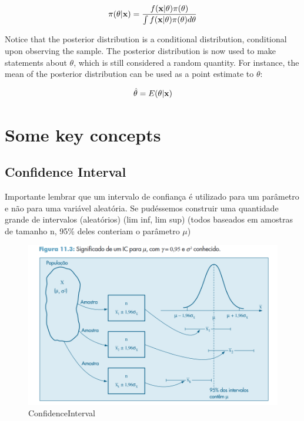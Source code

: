 \begin{itemize}
    \begin{equation}
        \pi(\theta|\bold{x}) = \frac{f(\bold{x}|\theta)\pi(\theta)}{\int f(\bold{x}|\theta)\pi(\theta) d\theta}
    \end{equation}
    
    Notice that the posterior distribution is a conditional distribution, conditional upon observing the sample. The posterior distribution is now used to make statements about $\theta$, which is still considered a random quantity. For instance, the mean of the posterior distribution can be used as a point estimate to $\theta$:
    
    \begin{equation}
        \hat{\theta} = E(\theta|\bold{x})
    \end{equation}
\end{itemize}

\section{Some key concepts}

\subsection{Confidence Interval}
Importante lembrar que um intervalo de confiança é utilizado para um parâmetro e não para uma variável aleatória. Se pudéssemos construir uma quantidade grande de intervalos (aleatórios) (lim inf, lim sup) (todos baseados em amostras de tamanho n, 95\% deles conteriam o parâmetro $\mu$)

\begin{figure}[H]
\centering
\caption{ConfidenceInterval}
\includegraphics[scale=.5]{Figures/confidence-interval.PNG}
\end{figure}

